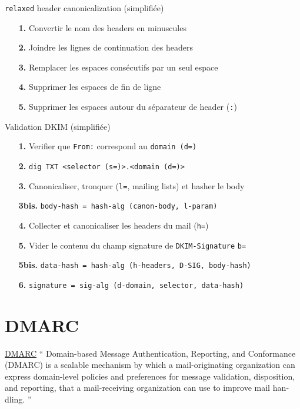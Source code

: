 \documentclass{beamer}
\begin{document}
\begin{frame}{\texttt{relaxed} header canonicalization (simplifiée)}
    \begin{itemize}
        \item[\textbf{1.}] Convertir le nom des headers en minuscules
        \item[\textbf{2.}] Joindre les lignes de continuation des headers
        \item[\textbf{3.}] Remplacer les espaces consécutifs par un seul espace
        \item[\textbf{4.}] Supprimer les espaces de fin de ligne
        \item[\textbf{5.}] Supprimer les espaces autour du séparateur de header (\texttt{:})
    \end{itemize}
\end{frame}

\begin{frame}{Validation DKIM (simplifiée)}
    \begin{itemize}
        \item[\textbf{1.}] Verifier que \texttt{From:} correspond au \texttt{domain (d=)}
        \item[\textbf{2.}] \texttt{dig TXT <selector (s=)>.<domain (d=)>}
        \item[\textbf{3.}] Canonicaliser, tronquer (\texttt{l=}, mailing lists) et hasher le body
        \item[\textbf{3bis.}] \texttt{body-hash    =  hash-alg (canon-body, l-param)}
        \item[\textbf{4.}] Collecter et canonicaliser les headers du mail (\texttt{h=})
        \item[\textbf{5.}] Vider le contenu du champ signature de \texttt{DKIM-Signature} \texttt{b=}
        \item[\textbf{5bis.}] \texttt{data-hash    =  hash-alg (h-headers, D-SIG, body-hash)}
        \item[\textbf{6.}] \texttt{signature    =  sig-alg (d-domain, selector, data-hash)}
    \end{itemize}
\end{frame}

\section{DMARC}

\begin{frame}{\href{https://datatracker.ietf.org/doc/html/rfc7489}{DMARC}}
    \foreignquote{english}{
        Domain-based Message Authentication, Reporting, and Conformance (DMARC)
        is a scalable mechanism by which a mail-originating organization can
        express domain-level policies and preferences for message validation,
        disposition, and reporting, that a mail-receiving organization can use
        to improve mail handling.
   }
\end{frame}
\end{document}
